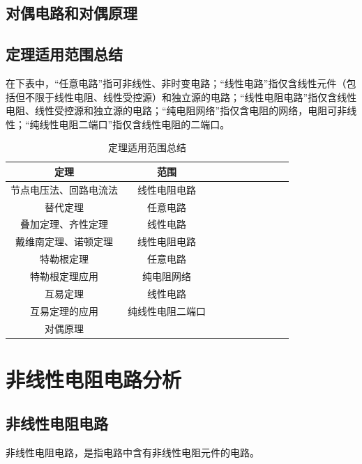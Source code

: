 \documentclass[UTF8]{report}
\theoremstyle{MyLineTheoremStyle} %
\theoremstyle{MyBlockTheoremStyle} %
\theoremstyle{MySubsubsectionStyle} %
\begin{document}
\section{对偶电路和对偶原理}

\section{定理适用范围总结}


在下表中，“任意电路”指可非线性、非时变电路；“线性电路”指仅含线性元件（包括但不限于线性电阻、线性受控源）和独立源的电路；“线性电阻电路”指仅含线性电阻、线性受控源和独立源的电路；“纯电阻网络”指仅含电阻的网络，电阻可非线性；“纯线性电阻二端口”指仅含线性电阻的二端口。

\begin{table}[H]\centering
    \caption{定理适用范围总结}
    \label{定理适用范围总结}
\begin{tabular}{cccccccccc}\toprule
    定理 & 范围  \\
    \midrule
    节点电压法、回路电流法 &线性电阻电路 \\
    替代定理 & 任意电路 \\
    叠加定理、齐性定理 & 线性电路 \\
    戴维南定理、诺顿定理 & 线性电阻电路\\
    特勒根定理 & 任意电路 \\
    特勒根定理应用 & {\color{red} 纯电阻网络} \\
    互易定理 & 线性电路 \\
    互易定理的应用 & {\color{red} 纯线性电阻二端口} \\
    对偶原理 &  \\
    \bottomrule
\end{tabular}
\end{table}



\chapter{非线性电阻电路分析}\thispagestyle{fancy}

\section{非线性电阻电路}

非线性电阻电路，是指电路中含有非线性电阻元件的电路。
\end{document}

